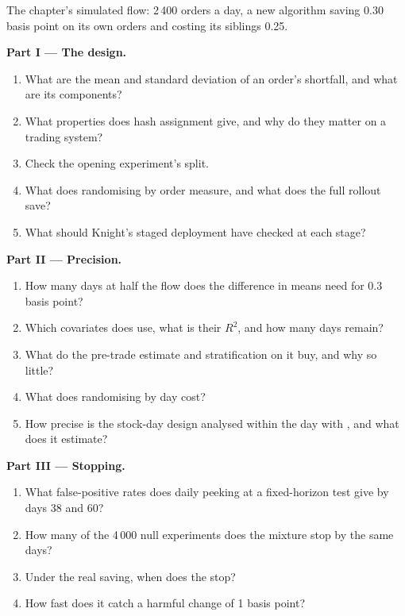 \begin{problem}\label{pb:rs:live-experiments:1}
The chapter's simulated flow: 2\,400 orders a day, a new algorithm saving 0.30 basis point on its own orders and costing its siblings 0.25.

\medskip\noindent\textbf{Part I --- The design.}
\begin{enumerate}
\item What are the mean and standard deviation of an order's shortfall, and what are its components?
\item What properties does hash assignment give, and why do they matter on a trading system?
\item Check the opening experiment's split.
\item What does randomising by order measure, and what does the full rollout save?
\item What should Knight's staged deployment have checked at each stage?
\end{enumerate}

\medskip\noindent\textbf{Part II --- Precision.}
\begin{enumerate}[resume]
\item How many days at half the flow does the difference in means need for 0.3 basis point?
\item Which covariates does  use, what is their $R^2$, and how many days remain?
\item What do the pre-trade estimate and stratification on it buy, and why so little?
\item What does randomising by day cost?
\item How precise is the stock-day design analysed within the day with , and what does it estimate?
\end{enumerate}

\medskip\noindent\textbf{Part III --- Stopping.}
\begin{enumerate}[resume]
\item What false-positive rates does daily peeking at a fixed-horizon test give by days 38 and 60?
\item How many of the 4\,000 null experiments does the mixture  stop by the same days?
\item Under the real saving, when does the  stop?
\item How fast does it catch a harmful change of 1 basis point?
\end{enumerate}


\end{problem}
